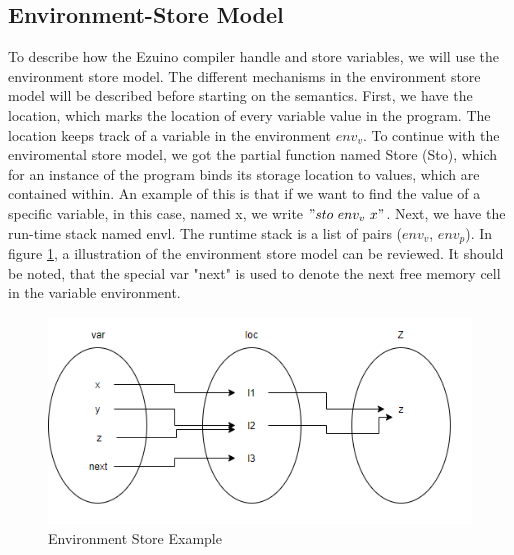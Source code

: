 \subsection{Environment-Store Model}
To describe how the Ezuino compiler handle and store variables, we will use the environment store model. The different mechanisms in the environment store model will be described before starting on the semantics. First, we have the location, which marks the location of every variable value in the program. The location keeps track of a variable in the environment $env_v$.
To continue with the enviromental store model, we got the partial function named Store (Sto), which for an instance of the program binds its storage location to values, which are contained within. An example of this is that if we want to find the value of a specific variable, in this case, named x, we write $"sto \ env_v \ x"$.
Next, we have the run-time stack named envl. The runtime stack is a list of pairs ($env_v$, $env_p$).
In figure \ref{evnstoreexmp}, a illustration of the environment store model can be reviewed.
It should be noted, that the special var "next" is used to denote the next free memory cell in the variable environment.
\begin{figure}[H]
\centering
\includegraphics[scale=0.75]{figures/evnstore.png}
\caption{Environment Store Example}
\label{evnstoreexmp}
\end{figure}



